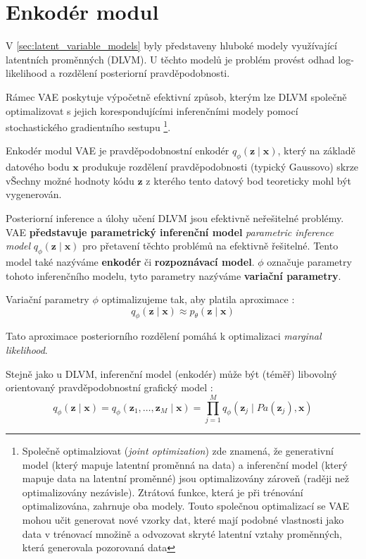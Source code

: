 \section{Enkodér modul}
V \autoref{sec:latent_variable_models} byly představeny hluboké modely využívající latentních proměnných (DLVM).
U těchto modelů je problém provést odhad log-likelihood a rozdělení posteriorní pravděpodobnosti.

Rámec VAE poskytuje výpočetně efektivní způsob, kterým lze DLVM společně optimalizovat s jejich korespondujícími inferenčními modely pomocí stochastického gradientního sestupu
\footnote{Společně optimalziovat (\emph{joint optimization}) zde znamená, že generativní model (který mapuje latentní proměnná na data) a inferenční model (který mapuje data na latentní proměnné) jsou optimalizovány zároveň (raději než optimalizovány nezávisle). Ztrátová funkce, která je při trénování optimalizována, zahrnuje oba modely. Touto společnou optimalizací se VAE mohou učit generovat nové vzorky dat, které mají podobné vlastnosti jako data v trénovací množině a odvozovat skryté latentní vztahy proměnných, která generovala pozorovaná data}.

Enkodér modul VAE je pravděpodobnostní enkodér $q_\phi(\textbf{z}\mid\textbf{x})$, který na základě datového bodu $\textbf{x}$ produkuje rozdělení pravděpodobnosti (typický Gaussovo) skrze vŠechny možné hodnoty kódu $\mathbf{z}$ z kterého tento datový bod teoreticky mohl být vygenerován.

Posteriorní inference a úlohy učení DLVM jsou efektivně neřešitelné problémy.
VAE \textbf{představuje parametrický inferenční model} \emph{parametric inference model} $q_\phi(\textbf{z}\mid\textbf{x})$ pro přetavení těchto problémů na efektivně řešitelné.
Tento model také nazýváme \textbf{enkodér} či \textbf{rozpoznávací model}.
$\phi$ označuje parametry tohoto inferenčního modelu, tyto parametry nazýváme \textbf{variační parametry}. \cite{Kingma2019}


Variační parametry $\phi$ optimalizujeme tak, aby platila aproximace \cite{Kingma2014}:
\begin{equation}
    q_\phi(\textbf{z}\mid\textbf{x}) \approx p_\theta(\textbf{z}\mid\textbf{x})
\end{equation}

Tato aproximace posteriorního rozdělení pomáhá k optimalizaci \emph{marginal likelihood}.

Stejně jako u DLVM, inferenční model (enkodér) může být (téměř) libovolný orientovaný pravděpodobnostní grafický model \cite{Kingma2019}:
\begin{equation}
    q_\phi(\textbf{z}\mid\textbf{x}) = q_\phi(\textbf{z}_1,\dots,\textbf{z}_M\mid\textbf{x}) = \prod_{j=1}^{M} q_\phi(\textbf{z}_j\mid Pa(\textbf{z}_j), \textbf{x})
\end{equation}

